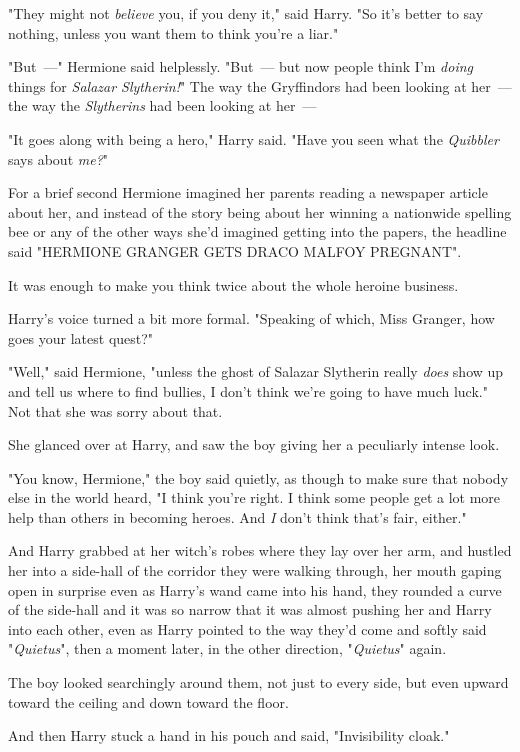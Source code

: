 "They might not \emph{believe} you, if you deny it," said Harry. "So it's
better to say nothing, unless you want them to think you're a liar."

"But~---" Hermione said helplessly. "But~--- but now people think I'm \emph{doing}
things for \emph{Salazar Slytherin!}" The way the Gryffindors had been looking
at her~--- the way the \emph{Slytherins} had been looking at her~---

"It goes along with being a hero," Harry said. "Have you seen what the
\emph{Quibbler} says about \emph{me?}"

For a brief second Hermione imagined her parents reading a newspaper article
about her, and instead of the story being about her winning a nationwide
spelling bee or any of the other ways she'd imagined getting into the papers,
the headline said "HERMIONE GRANGER GETS DRACO MALFOY PREGNANT".

It was enough to make you think twice about the whole heroine business.

Harry's voice turned a bit more formal. "Speaking of which, Miss Granger, how
goes your latest quest?"

"Well," said Hermione, "unless the ghost of Salazar Slytherin really
\emph{does} show up and tell us where to find bullies, I don't think we're
going to have much luck." Not that she was sorry about that.

She glanced over at Harry, and saw the boy giving her a peculiarly intense look.

"You know, Hermione," the boy said quietly, as though to make sure that nobody
else in the world heard, "I think you're right. I think some people get a lot
more help than others in becoming heroes. And \emph{I} don't think that's fair,
either."

And Harry grabbed at her witch's robes where they lay over her arm, and hustled
her into a side-hall of the corridor they were walking through, her mouth
gaping open in surprise even as Harry's wand came into his hand, they rounded a
curve of the side-hall and it was so narrow that it was almost pushing her and
Harry into each other, even as Harry pointed to the way they'd come and softly
said "\emph{Quietus}", then a moment later, in the other direction,
"\emph{Quietus}" again.

The boy looked searchingly around them, not just to every side, but even upward
toward the ceiling and down toward the floor.

And then Harry stuck a hand in his pouch and said, "Invisibility cloak."

